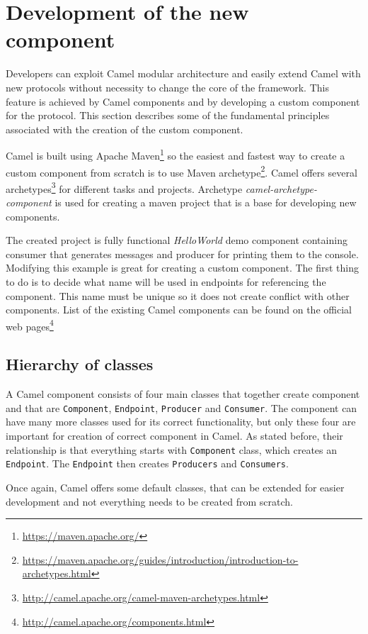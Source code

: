 \documentclass[12pt,final,oneside]{fithesis2}
\begin{document}
 
\section{Development of the new component}\label{component-devel}
Developers can exploit Camel modular architecture and easily extend Camel with new protocols without necessity to change the core of the framework. This feature is achieved by Camel components and by developing a custom component for the protocol. This section describes some of the fundamental principles associated with the creation of the custom component.

Camel is built using Apache Maven\footnote{\url{https://maven.apache.org/}} so the easiest and fastest way to create a custom component from scratch is to use Maven archetype\footnote{\url{https://maven.apache.org/guides/introduction/introduction-to-archetypes.html}}. Camel offers several archetypes\footnote{\url{http://camel.apache.org/camel-maven-archetypes.html}} for different tasks and projects. Archetype \textit{camel-archetype-component} is used for creating a maven project that is a base for developing new components\cite{camel-comp}. 

The created project is fully functional \textit{HelloWorld} demo component containing consumer that generates messages and producer for printing them to the console. Modifying this example is great for creating a custom component. The first thing to do is to decide what name will be used in endpoints for referencing the component. This name must be unique so it does not create conflict with other components. List of the existing Camel components can be found on the official web pages\footnote{\url{http://camel.apache.org/components.html}}

\subsection{Hierarchy of classes}
A Camel component consists of four main classes that together create component and that are \texttt{Component}, \texttt{Endpoint}, \texttt{Producer} and \texttt{Consumer}. The component can have many more classes used for its correct functionality, but only these four are important for creation of correct component in Camel. As stated before, their relationship is that everything starts with \texttt{Component} class, which creates an \texttt{Endpoint}. The \texttt{Endpoint} then creates \texttt{Producers} and \texttt{Consumers}.

Once again, Camel offers some default classes, that can be extended for easier development and not everything needs to be created from scratch.
\end{document}
